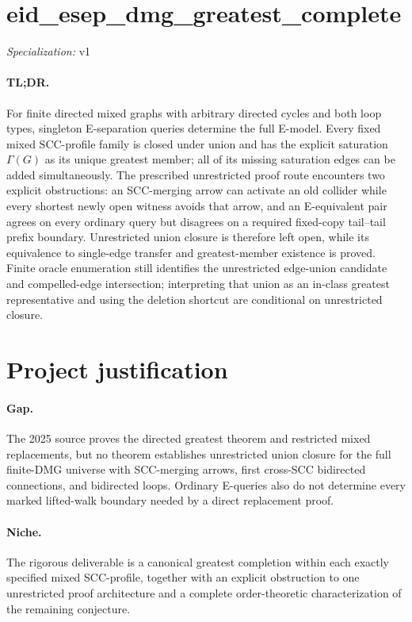\documentclass{article}
\begin{document}
\sloppy

\section*{eid\_\allowbreak{}esep\_\allowbreak{}dmg\_\allowbreak{}greatest\_\allowbreak{}complete}

\noindent\textit{Specialization:} v1\par

\paragraph{TL;DR.} For finite directed mixed graphs with arbitrary directed cycles and both loop types, singleton E-separation queries determine the full E-model. Every fixed mixed SCC-profile family is closed under union and has the explicit saturation \(\Gamma(G)\) as its unique greatest member; all of its missing saturation edges can be added simultaneously. The prescribed unrestricted proof route encounters two explicit obstructions: an SCC-merging arrow can activate an old collider while every shortest newly open witness avoids that arrow, and an E-equivalent pair agrees on every ordinary query but disagrees on a required fixed-copy tail--tail prefix boundary. Unrestricted union closure is therefore left open, while its equivalence to single-edge transfer and greatest-member existence is proved. Finite oracle enumeration still identifies the unrestricted edge-union candidate and compelled-edge intersection; interpreting that union as an in-class greatest representative and using the deletion shortcut are conditional on unrestricted closure.

\section{Project justification}

\paragraph{Gap.} The 2025 source proves the directed greatest theorem and restricted mixed replacements, but no theorem establishes unrestricted union closure for the full finite-DMG universe with SCC-merging arrows, first cross-SCC bidirected connections, and bidirected loops. Ordinary E-queries also do not determine every marked lifted-walk boundary needed by a direct replacement proof.

\paragraph{Niche.} The rigorous deliverable is a canonical greatest completion within each exactly specified mixed SCC-profile, together with an explicit obstruction to one unrestricted proof architecture and a complete order-theoretic characterization of the remaining conjecture.
\end{document}
